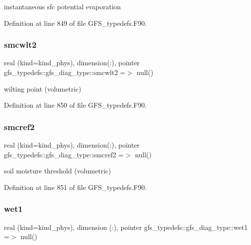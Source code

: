 instantaneous sfc potential evaporation 



Definition at line 849 of file G\+F\+S\+\_\+typedefs.\+F90.

\mbox{\label{structgfs__typedefs_1_1gfs__diag__type_a9a7ec558a1e42e03be16f778a1e5a857}} 
\subsubsection{smcwlt2}
{\footnotesize\ttfamily real (kind=kind\+\_\+phys), dimension(\+:), pointer gfs\+\_\+typedefs\+::gfs\+\_\+diag\+\_\+type\+::smcwlt2 =$>$ null()}



wilting point (volumetric) 



Definition at line 850 of file G\+F\+S\+\_\+typedefs.\+F90.

\mbox{\label{structgfs__typedefs_1_1gfs__diag__type_a597b7bc5550e9f8130a22aa77824a2d2}} 
\subsubsection{smcref2}
{\footnotesize\ttfamily real (kind=kind\+\_\+phys), dimension(\+:), pointer gfs\+\_\+typedefs\+::gfs\+\_\+diag\+\_\+type\+::smcref2 =$>$ null()}



soil moisture threshold (volumetric) 



Definition at line 851 of file G\+F\+S\+\_\+typedefs.\+F90.

\mbox{\label{structgfs__typedefs_1_1gfs__diag__type_a29ffa9980a633a61d23e94399c0c9f90}} 
\subsubsection{wet1}
{\footnotesize\ttfamily real (kind=kind\+\_\+phys), dimension   (\+:), pointer gfs\+\_\+typedefs\+::gfs\+\_\+diag\+\_\+type\+::wet1 =$>$ null()}



